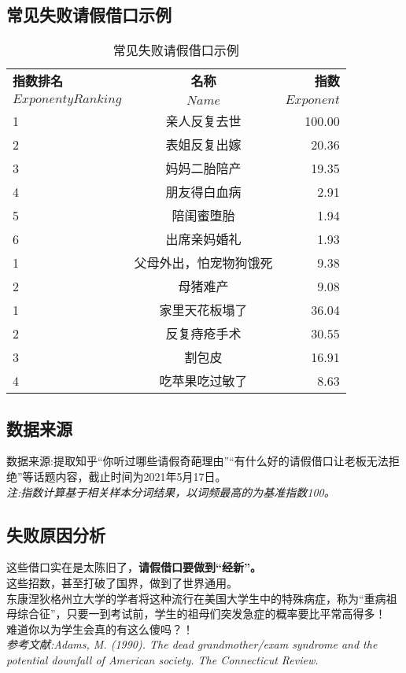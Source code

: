 \documentclass[UTF8]{ctexart}
\begin{document}
	\subsection{常见失败请假借口示例}
	\begin{table}[h!]
		\begin{center}
			\caption{常见失败请假借口示例}
			\begin{tabular}{l|c|r} %
				\textbf{指数排名} & \textbf{名称} & \textbf{指数}\\
				$ExponentyRanking$ & $Name$ & $Exponent$ \\
				\hline
				1 & 亲人反复去世 & 100.00\\
				2 & 表姐反复出嫁 & 20.36\\
				3 & 妈妈二胎陪产 & 19.35\\
				4 & 朋友得白血病 & 2.91\\
				5 & 陪闺蜜堕胎 & 1.94\\
				6 & 出席亲妈婚礼 & 1.93\\
				1 & 父母外出，怕宠物狗饿死 & 9.38\\
				2 & 母猪难产 & 9.08\\
				1 & 家里天花板塌了 & 36.04\\
				2 & 反复痔疮手术 & 30.55\\
				3 & 割包皮 & 16.91\\
				4 & 吃苹果吃过敏了 & 8.63\\
			\end{tabular}
		\end{center}
	\end{table}
\newpage
	\subsection{数据来源}
数据来源:提取知乎“你听过哪些请假奇葩理由”“有什么好的请假借口让老板无法拒绝”等话题内容，截止时间为2021年5月17日。\\
\textit{注:指数计算基于相关样本分词结果，以词频最高的为基准指数100。}
	\subsection{失败原因分析}
	这些借口实在是太陈旧了，\textbf{请假借口要做到“经新”。}\\
	这些招数，甚至打破了国界，做到了世界通用。\\
	东康涅狄格州立大学的学者将这种流行在美国大学生中的特殊病症，称为“重病祖母综合征”，只要一到考试前，学生的祖母们突发急症的概率要比平常高得多！\\
	难道你以为学生会真的有这么傻吗？！\\
	\textit{参考文献:Adams, M. (1990). The dead grandmother/exam syndrome and the potential downfall of American society. The Connecticut Review.}
\end{document}
